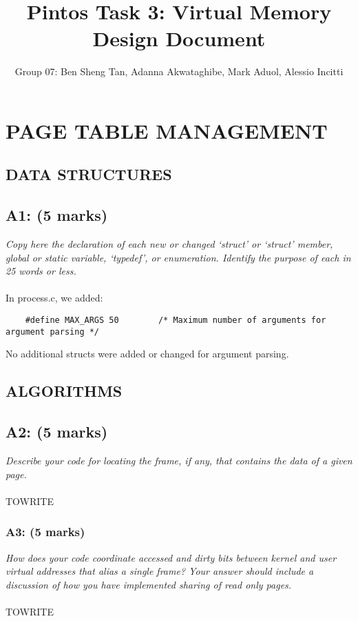\documentclass{article}
\title{Pintos Task 3: Virtual Memory Design Document}
\author{Group 07: Ben Sheng Tan, Adanna Akwataghibe, Mark Aduol, Alessio Incitti }
\begin{document}
\maketitle

\section{PAGE TABLE MANAGEMENT}

\subsection{ DATA STRUCTURES}

\subsection*{A1: (5 marks) }

\textit{Copy here the declaration of each new or changed ‘struct’ or ‘struct’ member, global or static variable, ‘typedef’, or enumeration. Identify the purpose of each in 25 words or less.}
\\ \\
In process.c, we added:
\begin{lstlisting}
	#define MAX_ARGS 50		   /* Maximum number of arguments for argument parsing */
\end{lstlisting}
No additional structs were added or changed for argument parsing.

\subsection{ALGORITHMS}

\subsection*{A2: (5 marks) }

\textit{Describe your code for locating the frame, if any, that contains the data of a given page.}
\\ \\
TOWRITE


\subsubsection*{A3: (5 marks) }
\textit{How does your code coordinate accessed and dirty bits between
 kernel and user virtual addresses that alias a single frame?
 Your answer should include a discussion of how you have implemented
 sharing of read only pages.}
\\ \\
TOWRITE
\end{document}

